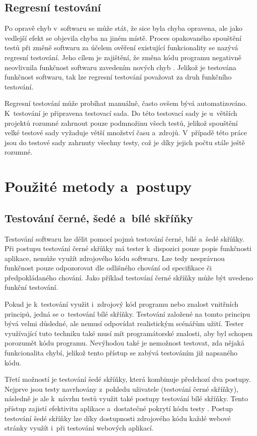 \documentclass[
    color,   %
	table,   %
    twoside, %
    nolot, nolof,
]{fithesis3}
\begin{document}
\subsection{Regresní testování}
Po opravě chyb v~softwaru se může stát, že sice byla chyba opravena, ale jako vedlejší efekt se objevila chyba na jiném místě. Proces opakovaného spouštění testů při změně softwaru za účelem ověření existující funkcionality se nazývá regresní testování. Jeho cílem je zajištění, že změna kódu programu negativně neovlivnila funkčnost softwaru zavedením nových chyb \cite{Myers}. Jelikož je testována funkčnost softwaru, tak lze regresní testování považovat za druh funkčního testování. 

Regresní testování může probíhat manuálně, často ovšem bývá automatizováno. K~testování je připravena testovací sada. Do této testovací sady je u~větších projektů rozumné zahrnout pouze podmnožinu všech testů, jelikož spouštění velké testové sady vyžaduje větší množství času a~zdrojů. V~případě této práce jsou do testové sady zahrnuty všechny testy, což je díky jejich počtu stále ještě rozumné.

\section{Použité metody a~postupy}
\subsection{Testování černé, šedé a~bílé skříňky}
Testování softwaru lze dělit pomocí pojmů testování černé, bílé a~šedé skříňky. Při postupu testování černé skříňky má tester k~dispozici pouze popis funkčnosti aplikace, nemůže využít zdrojového kódu softwaru. Lze tedy nesprávnou funkčnost pouze odpozorovat dle odlišného chování od specifikace či předpokládaného chování. Jako příklad testování černé skříňky může být uvedeno funkční testování.

Pokud je k~testování využit i~zdrojový kód programu nebo znalost vnitřních principů, jedná se o~testování bílé skříňky. Testování založené na tomto principu bývá velmi důsledné, ale nemusí odpovídat realistickým scénářům užití. Tester využívající tuto techniku také musí mít programátorské znalosti, aby byl schopen porozumět kódu programu. Nevýhodou také je nemožnost testovat, zda nějaká funkcionalita chybí, jelikož tento přístup se zabývá testováním již napsaného kódu.

Třetí možností je testování šedé skříňky, která kombinuje předchozí dva postupy. Nejprve jsou testy navrhovány z~pohledu uživatele (testování černé skříňky), následně je ale k~návrhu testů využit také postupy testování bílé skříňky. Tento přístup zajistí efektivitu aplikace a~dostatečné pokrytí kódu testy \cite{Page}. Postup testování šedé skříňky lze díky dostupnosti zdrojového kódu každé webové stránky využít i~při testování webových aplikací.
\end{document}
